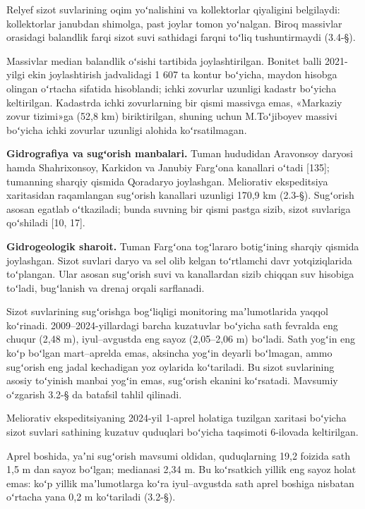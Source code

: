 Relyef sizot suvlarining oqim yoʻnalishini va kollektorlar qiyaligini
belgilaydi: kollektorlar janubdan shimolga, past joylar tomon yoʻnalgan.
Biroq massivlar orasidagi balandlik farqi sizot suvi sathidagi farqni
toʻliq tushuntirmaydi (3.4-§).

Massivlar median balandlik oʻsishi tartibida joylashtirilgan. Bonitet
balli 2021-yilgi ekin joylashtirish jadvalidagi 1 607 ta kontur
boʻyicha, maydon hisobga olingan oʻrtacha sifatida hisoblandi; ichki
zovurlar uzunligi kadastr boʻyicha keltirilgan. Kadastrda ichki
zovurlarning bir qismi massivga emas, «Markaziy zovur tizimi»ga (52,8
km) biriktirilgan, shuning uchun M.Toʻjiboyev massivi boʻyicha ichki
zovurlar uzunligi alohida koʻrsatilmagan.

\textbf{Gidrografiya va sugʻorish manbalari.} Tuman hududidan Aravonsoy
daryosi hamda Shahrixonsoy, Karkidon va Janubiy Fargʻona kanallari
oʻtadi {[}135{]}; tumanning sharqiy qismida Qoradaryo joylashgan.
Meliorativ ekspeditsiya xaritasidan raqamlangan sugʻorish kanallari
uzunligi 170,9 km (2.3-§). Sugʻorish asosan egatlab oʻtkaziladi; bunda
suvning bir qismi pastga sizib, sizot suvlariga qoʻshiladi {[}10, 17{]}.

\textbf{Gidrogeologik sharoit.} Tuman Fargʻona togʻlararo botigʻining
sharqiy qismida joylashgan. Sizot suvlari daryo va sel olib kelgan
toʻrtlamchi davr yotqiziqlarida toʻplangan. Ular asosan sugʻorish suvi
va kanallardan sizib chiqqan suv hisobiga toʻladi, bugʻlanish va drenaj
orqali sarflanadi.

Sizot suvlarining sugʻorishga bogʻliqligi monitoring maʼlumotlarida
yaqqol koʻrinadi. 2009--2024-yillardagi barcha kuzatuvlar boʻyicha sath
fevralda eng chuqur (2,48 m), iyul--avgustda eng sayoz (2,05--2,06 m)
boʻladi. Sath yogʻin eng koʻp boʻlgan mart--aprelda emas, aksincha
yogʻin deyarli boʻlmagan, ammo sugʻorish eng jadal kechadigan yoz
oylarida koʻtariladi. Bu sizot suvlarining asosiy toʻyinish manbai
yogʻin emas, sugʻorish ekanini koʻrsatadi. Mavsumiy oʻzgarish 3.2-§ da
batafsil tahlil qilinadi.

Meliorativ ekspeditsiyaning 2024-yil 1-aprel holatiga tuzilgan xaritasi
boʻyicha sizot suvlari sathining kuzatuv quduqlari boʻyicha taqsimoti
6-ilovada keltirilgan.

Aprel boshida, yaʼni sugʻorish mavsumi oldidan, quduqlarning 19,2
foizida sath 1,5 m dan sayoz boʻlgan; medianasi 2,34 m. Bu koʻrsatkich
yillik eng sayoz holat emas: koʻp yillik maʼlumotlarga koʻra
iyul--avgustda sath aprel boshiga nisbatan oʻrtacha yana 0,2 m
koʻtariladi (3.2-§).

